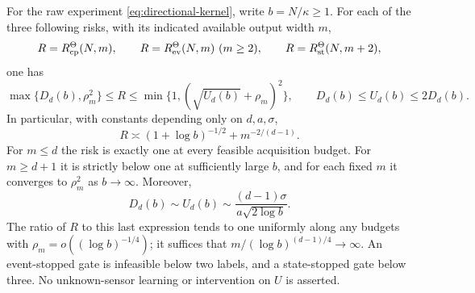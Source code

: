 \begin{theorem}\label{thm:directional}
For the raw experiment \eqref{eq:directional-kernel}, write $b=N/\kappa\ge1$. For each of the three following risks, with its indicated available output width $m$,
\[
 R=R_{\mathrm{cp}}^\Theta(N,m),\qquad
 R=R_{\mathrm{ev}}^\Theta(N,m)\ (m\ge2),\qquad
 R=R_{\mathrm{st}}^\Theta(N,m+2),
\]
one has
\begin{equation}\label{eq:directional-bounds}
 \max\{D_d(b),\rho_m^2\}\le R
 \le\min\{1,(\sqrt{U_d(b)}+\rho_m)^2\},
 \qquad D_d(b)\le U_d(b)\le2D_d(b).
\end{equation}
In particular, with constants depending only on $d,a,\sigma$,
\begin{equation}\label{eq:directional-law}
 R\asymp (1+\log b)^{-1/2}+m^{-2/(d-1)}.
\end{equation}
For $m\le d$ the risk is exactly one at every feasible acquisition budget. For $m\ge d+1$ it is strictly below one at sufficiently large $b$, and for each fixed $m$ it converges to $\rho_m^2$ as $b\to\infty$. Moreover,
\begin{equation}\label{eq:directional-sharp}
 D_d(b)\sim U_d(b)\sim
 \frac{(d-1)\sigma}{a\sqrt{2\log b}}.
\end{equation}
The ratio of $R$ to this last expression tends to one uniformly along any budgets with $\rho_m=o((\log b)^{-1/4})$; it suffices that $m/(\log b)^{(d-1)/4}\to\infty$. An event-stopped gate is infeasible below two labels, and a state-stopped gate below three. No unknown-sensor learning or intervention on $U$ is asserted.
\end{theorem}
